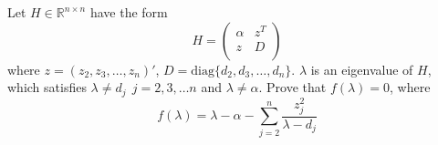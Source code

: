 \documentclass{article}
\begin{document}
Let $H\in \mathbb{R}^{n\times n}$ have the form
\[
H=\left(\begin{array}{cc}
\alpha & z^T \\
z & D \\
\end{array}
\right)
\]
where $z = (z_2, z_3, \ldots, z_n)'$, 
$D=\mathrm{diag}\{d_2, d_3, \ldots, d_n\}$.
$\lambda$ is an eigenvalue of $H$, which satisfies 
$\lambda \neq d_j~~j=2,3,\ldots n$ and $\lambda \neq \alpha$. 
Prove that $f(\lambda) = 0$, where
\[
f(\lambda)=\lambda - \alpha-\sum_{j=2}^n\frac{z_j^2}{\lambda - d_j}
\]
\end{document}
